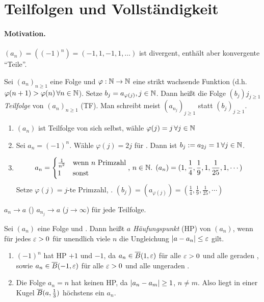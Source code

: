 \documentclass[12pt]{scrreprt}
\begin{document}
\section{Teilfolgen und Vollständigkeit}
\label{sec:konv.teilfolgen}

\paragraph{Motivation.} $(a_n) = ((-1)^n) = (-1,1,-1,1,\dotsc)$ ist
divergent, enthält aber konvergente "`Teile"'.

\begin{dfn}
  \label{dfn:konv.teilfolge}
  Sei $(a_n)_{n\ge1}$ eine Folge und $\varphi: \mathbb{N} \rightarrow
  \mathbb{N}$ eine strikt wachsende Funktion
  (d.h. $\varphi(n+1)>\varphi(n)\,\forall n\in\mathbb{N}$). Setze
  $b_j=a_{\varphi(j)}, j\in\mathbb{N}$. Dann heißt die Folge $(b_j)j_{j\ge1}$
  \emph{Teilfolge} von $(a_n)_{n\ge1}$ (TF). Man schreibt meist
  $\left(a_{n_j}\right)_{j\ge1}$ statt $(b_j)_{j\ge1}$.
\end{dfn}

\begin{bsp*}
  \begin{enumerate}
  \item $(a_n)$ ist Teilfolge von sich selbst, wähle
    $\varphi(j)=j\,\forall j\in\mathbb{N}$
  \item Sei $a_n=(-1)^n$. Wähle $\varphi(j)=2j$ für . Dann ist
    $b_j:=a_{2j}=1 \,\forall j\in\mathbb{N}$.
  \item \[a_n = \begin{cases} \frac{1}{n^2} & \text{wenn } n \text{
        Primzahl} \\ 1 & \text{sonst} \end{cases} \text{, } n\in\mathbb{N}
    \text{. } (a_n) = (1, \frac14, \frac19, 1, \frac{1}{25}, 1,
    \dotsm)\] Setze $\varphi(j)=j$-te Primzahl, . \folgt $(b_j)
    = (a_{\varphi(j)}) = (\frac14, \frac19, \frac{1}{25},\dotsm)$
  \end{enumerate}
\end{bsp*}

\begin{bem*}
  $a_n\to a$ (\ninf) \folgt $a_{n_j}\to a$ ($j\to\infty$) für jede
  Teilfolge.
\end{bem*}

\begin{dfn}
  \label{dfn:konv.hp}
  Sei $(a_n)$ eine Folge und . Dann heißt $a$
  \emph{Häufungspunkt} (HP) von $(a_n)$, wenn für jedes $\varepsilon>0$ für
  unendlich viele $n$ die Ungleichung $\left\lvert a-a_n\right\lvert\le\varepsilon$ gilt.
\end{dfn}
\begin{bsp*}
  \begin{enumerate}
  \item $(-1)^n$ hat HP $+1$ und $-1$, da $a_n\in\overline{B}(1,\varepsilon)$ für
    alle $\varepsilon>0$ und alle geraden , sowie
    $a_n\in\overline{B}(-1,\varepsilon)$ für alle $\varepsilon>0$ und alle ungeraden
    .
  \item Die Folge $a_n=n$ hat keinen HP, da $\left\lvert a_n-a_m\right\lvert\ge1$, $n\ne
    m$. Also liegt in einer Kugel $\overline{B}(a, \frac13)$ höchstens ein
    $a_n$.
  \end{enumerate}
\end{bsp*}
\end{document}
